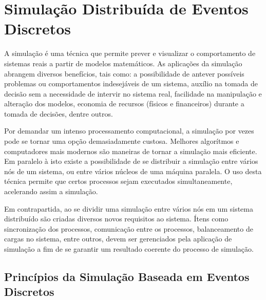 \chapter{Simulação Distribuída de Eventos Discretos}


A simulação é uma técnica que permite prever e visualizar o comportamento de sistemas reais a partir de modelos matemáticos. As aplicações da simulação abrangem diversos benefícios, tais como: a possibilidade de antever possíveis problemas ou comportamentos indesejáveis de um sistema, auxílio na tomada de decisão sem a necessidade de intervir no sistema real, facilidade na manipulação e alteração dos modelos, economia de recursos (físicos e financeiros) durante a tomada de decisões, dentre outros.


Por demandar um intenso processamento computacional, a simulação por vezes pode se tornar uma opção demasiadamente custosa. Melhores algorítmos e computadores mais modernos são maneiras de tornar a simulação mais eficiente. Em paralelo à isto existe a possibilidade de se distribuir a simulação entre vários nós de um sistema, ou entre vários núcleos de uma máquina paralela. O uso desta técnica permite que certos processos sejam executados simultaneamente, acelerando assim a simulação.


Em contrapartida, ao se dividir uma simulação entre vários nós em um sistema distribuído são criadas diversos novos requisitos ao sistema. Ítens como sincronização dos processos, comunicação entre os processos, balanceamento de cargas no sistema, entre outros, devem ser gerenciados pela aplicação de simulação a fim de se garantir um resultado coerente do processo de simulação.

\section{Princípios da Simulação Baseada em Eventos Discretos}

